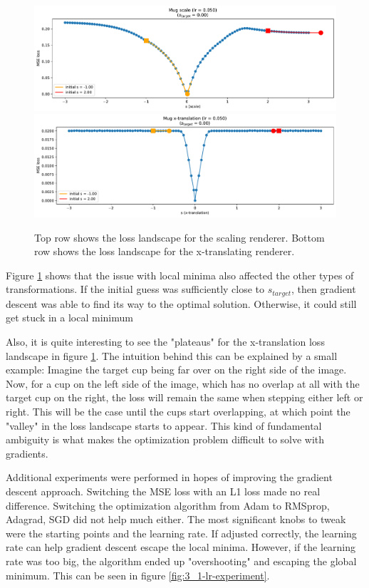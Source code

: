 \begin{figure}
    \centering
    \includegraphics[width=1.0\textwidth]{figures/3_1-mse-gd-scale-optimization.pdf}
    \includegraphics[width=1.0\textwidth]{figures/3_1-mse-gd-x-translation-optimization.pdf}
    \caption{Top row shows the loss landscape for the scaling renderer. Bottom row shows the loss landscape for the x-translating renderer.}
    \label{fig:3_1-other-transforms}
\end{figure}
Figure \ref{fig:3_1-other-transforms} shows that the issue with local minima also affected the other types of transformations. If the initial guess was sufficiently close to $s_{target}$, then gradient descent was able to find its way to the optimal solution. Otherwise, it could still get stuck in a local minimum

Also, it is quite interesting to see the "plateaus" for the x-translation loss landscape in figure \ref{fig:3_1-other-transforms}. The intuition behind this can be explained by a small example: Imagine the target cup being far over on the right side of the image. Now, for a cup on the left side of the image, which has no overlap at all with the target cup on the right, the loss will remain the same when stepping either left or right. This will be the case until the cups start overlapping, at which point the "valley" in the loss landscape starts to appear. This kind of fundamental ambiguity is what makes the optimization problem difficult to solve with gradients.

Additional experiments were performed in hopes of improving the gradient descent approach. Switching the MSE loss with an L1 loss made no real difference. Switching the optimization algorithm from Adam to RMSprop, Adagrad, SGD did not help much either. The most significant knobs to tweak were the starting points and the learning rate. If adjusted correctly, the learning rate can help gradient descent escape the local minima. However, if the learning rate was too big, the algorithm ended up "overshooting" and escaping the global minimum. This can be seen in figure \ref{fig:3_1-lr-experiment}.

